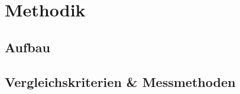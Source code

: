 \chapter{Methodik}
\label{chap:methodik}

\section{Aufbau}
\section{Vergleichskriterien \& Messmethoden}
